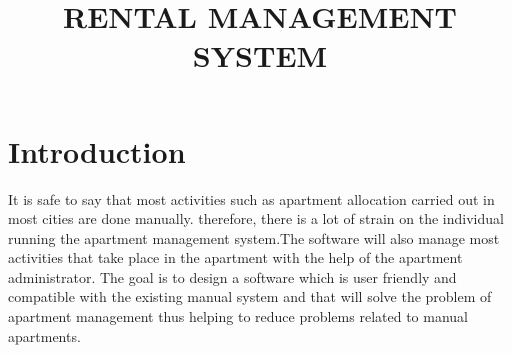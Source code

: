 \documentclass[]{report}
\title{RENTAL MANAGEMENT SYSTEM}
\author{}
\begin{document}
\maketitle
\chapter*{Introduction}

It is safe to say that most activities such as apartment allocation carried out in most cities are done manually. therefore, there is a lot of strain on the individual running the apartment management system.The software will also manage most activities that take place in the apartment with the help of the apartment administrator. The goal is to design a software which is user friendly and compatible with the existing manual system and that will solve the problem of apartment management thus helping to reduce problems related to manual apartments.
\end{document}
